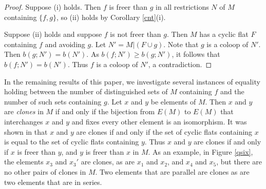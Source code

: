 \documentclass[12pt,reqno]{amsart}
\theoremstyle{definition}
\theoremstyle{remark}
\numberwithin{equation}{section}
\begin{document}
    \begin{proof}
        Suppose (i) holds. Then $f$ is freer than $g$ in all restrictions $N$ of $M$ containing $\{f,g\}$, so (ii) holds by Corollary \ref{cnt}(i). 
        
        Suppose (ii) holds and suppose $f$ is not freer than $g$. Then $M$ has a cyclic flat $F$ containing $f$ and avoiding $g$. Let $N'=M|(F\cup g)$. Note that $g$ is a coloop of $N'$. 
        Then $b(g;N')=b(N')$. 
        As $b(f;N')\geq b(g;N')$, it follows that $b(f;N')=b(N')$. Thus $f$ is a coloop of $N'$, a contradiction. 
    \end{proof}

    In the remaining results of this paper, we investigate several instances of equality holding between the number of distinguished sets of $M$ containing $f$ and the number of such sets containing $g$. 
    Let $x$ and $y$ be elements of $M$. 
    Then $x$ and $y$ are \textit{clones} in $M$ if and only if the bijection from $E(M)$ to $E(M)$ that interchanges $x$ and $y$ and fixes every other element is an isomorphism.
    It was shown in \cite[Proposition 4.9]{geelen} that $x$ and $y$ are clones if and only if the set of cyclic flats containing $x$ is equal to the set of cyclic flats containing $y$. 
    Thus $x$ and $y$ are clones if and only if $x$ is freer than $y$, and $y$ is freer than $x$ in $M$. As an example, in Figure \ref{qsix}, the elements $x_3$ and $x_3'$ are clones, as are $x_1$ and $x_2$, and $x_4$ and $x_5$, but there are no other pairs of clones in $M$. Two elements that are parallel are clones as are two elements that are in series. 
   
\end{document}
